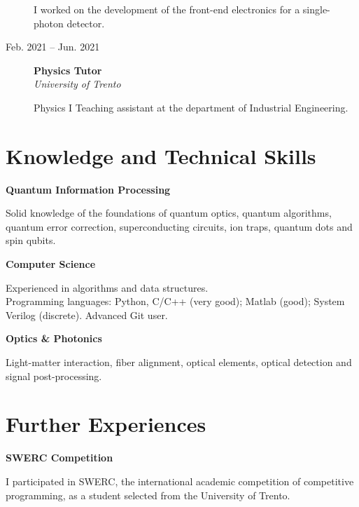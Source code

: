 \documentclass[a4paper,10pt]{article}
\begin{document}
\begin{adjustbox}{valign=t}
\begin{minipage}{0.6\textwidth}
\begin{description}
\begin{spacing}{1.2}
		\small
		I worked on the development of the front-end electronics for a single-photon detector.
	\end{spacing}
\item[\normalfont \textcolor{ColorTwo}{Feb. 2021 -- Jun. 2021}] 
	\textbf{Physics Tutor}\\
	\emph{University of Trento}
	\begin{spacing}{1.2}
		\small 
		Physics I Teaching assistant at the department of Industrial Engineering.
	\end{spacing}
\end{description}
\vspace{-1cm}
\section*{Knowledge and Technical Skills}
\begin{description}
\setlength\itemsep{-2em}

\item \textbf{Quantum Information Processing}
\begin{spacing}{1.2}
	\small Solid knowledge of the foundations of quantum optics, quantum algorithms, quantum error correction, superconducting circuits, ion traps, quantum dots and spin qubits.
\end{spacing}
\item \textbf{Computer Science}
\begin{spacing}{1.2}
	\small
	Experienced in algorithms and data structures.\\
	Programming languages: Python, C/C++ (very good); Matlab (good); System Verilog (discrete). Advanced Git user.
\end{spacing}

\item \textbf{Optics \& Photonics}
\begin{spacing}{1.2}
	\small Light-matter interaction, fiber alignment, optical elements, optical detection and signal post-processing.\normalsize
\end{spacing}
	
\end{description}
\vspace{-1cm}
\section*{Further Experiences}
\begin{description}
\raggedright
\item[\normalfont \textcolor{ColorTwo}{March 2021}] 
	\textbf{SWERC Competition}\\
	\begin{spacing}{1.4}
		\small
		I participated in SWERC, the international academic competition of competitive programming, as a student selected from the University of Trento.		
	\end{spacing}
	

\end{description}
\end{minipage}
\end{adjustbox}
\end{document}
